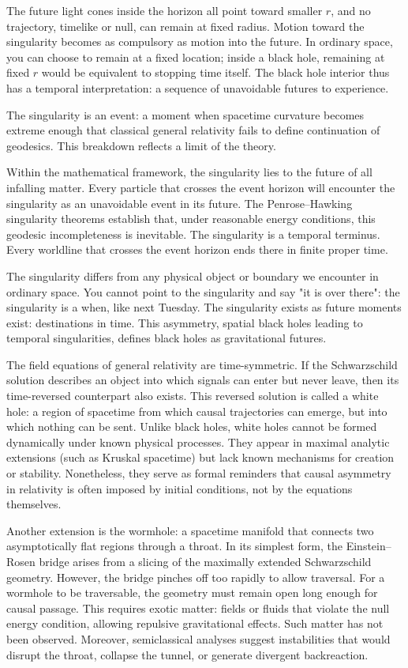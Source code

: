 The future light cones inside the horizon all point toward smaller $r$, and no trajectory, timelike or null, can remain at fixed radius. Motion toward the singularity becomes as compulsory as motion into the future. In ordinary space, you can choose to remain at a fixed location; inside a black hole, remaining at fixed $r$ would be equivalent to stopping time itself. The black hole interior thus has a temporal interpretation: a sequence of unavoidable futures to experience.


The singularity is an event: a moment when spacetime curvature becomes extreme enough that classical general relativity fails to define continuation of geodesics. This breakdown reflects a limit of the theory.

Within the mathematical framework, the singularity lies to the future of all infalling matter. Every particle that crosses the event horizon will encounter the singularity as an unavoidable event in its future. The Penrose–Hawking singularity theorems establish that, under reasonable energy conditions, this geodesic incompleteness is inevitable. The singularity is a temporal terminus. Every worldline that crosses the event horizon ends there in finite proper time.

The singularity differs from any physical object or boundary we encounter in ordinary space. You cannot point to the singularity and say "it is over there": the singularity is a when, like next Tuesday. The singularity exists as future moments exist: destinations in time. This asymmetry, spatial black holes leading to temporal singularities, defines black holes as gravitational futures.


The field equations of general relativity are time-symmetric. If the Schwarzschild solution describes an object into which signals can enter but never leave, then its time-reversed counterpart also exists. This reversed solution is called a white hole: a region of spacetime from which causal trajectories can emerge, but into which nothing can be sent. Unlike black holes, white holes cannot be formed dynamically under known physical processes. They appear in maximal analytic extensions (such as Kruskal spacetime) but lack known mechanisms for creation or stability. Nonetheless, they serve as formal reminders that causal asymmetry in relativity is often imposed by initial conditions, not by the equations themselves.


Another extension is the wormhole: a spacetime manifold that connects two asymptotically flat regions through a throat. In its simplest form, the Einstein–Rosen bridge arises from a slicing of the maximally extended Schwarzschild geometry. However, the bridge pinches off too rapidly to allow traversal. For a wormhole to be traversable, the geometry must remain open long enough for causal passage. This requires exotic matter: fields or fluids that violate the null energy condition, allowing repulsive gravitational effects. Such matter has not been observed. Moreover, semiclassical analyses suggest instabilities that would disrupt the throat, collapse the tunnel, or generate divergent backreaction.


